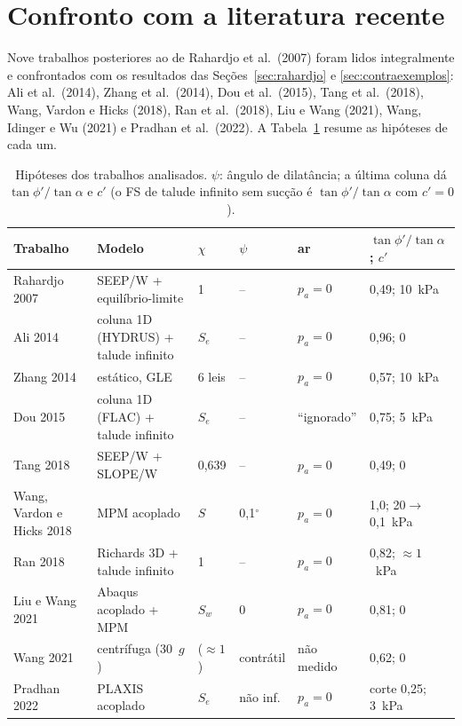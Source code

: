 \section{Confronto com a literatura recente}\label{sec:literatura}

Nove trabalhos posteriores ao de Rahardjo et al.\ (2007) foram lidos integralmente e confrontados com os resultados
das Se\c{c}\~oes~\ref{sec:rahardjo} e \ref{sec:contraexemplos}: Ali et al.\ (2014), Zhang et al.\ (2014),
Dou et al.\ (2015), Tang et al.\ (2018), Wang, Vardon e Hicks (2018), Ran et al.\ (2018), Liu e Wang (2021),
Wang, Idinger e Wu (2021) e Pradhan et al.\ (2022). A Tabela~\ref{tab:literatura} resume as hip\'oteses de cada um.

\begin{table}[h!]
\centering\small
\caption{Hip\'oteses dos trabalhos analisados. $\psi$: \^angulo de dilat\^ancia; a \'ultima coluna d\'a
$\tan\phi'/\tan\alpha$ e $c'$ (o FS de talude infinito sem suc\c{c}\~ao \'e $\tan\phi'/\tan\alpha$ com $c'=0$).}
\label{tab:literatura}
\begin{tabular}{p{2.5cm}p{3.6cm}p{1.2cm}p{1.5cm}p{1.6cm}p{2.4cm}}
\toprule
Trabalho & Modelo & $\chi$ & $\psi$ & ar & $\tan\phi'/\tan\alpha$; $c'$\\
\midrule
Rahardjo 2007 & SEEP/W + equil\'ibrio-limite & 1 & -- & $p_a=0$ & 0,49; 10~kPa\\
Ali 2014 & coluna 1D (HYDRUS) + talude infinito & $S_e$ & -- & $p_a=0$ & 0,96; 0\\
Zhang 2014 & est\'atico, GLE & 6 leis & -- & $p_a=0$ & 0,57; 10~kPa\\
Dou 2015 & coluna 1D (FLAC) + talude infinito & $S_e$ & -- & ``ignorado'' & 0,75; 5~kPa\\
Tang 2018 & SEEP/W + SLOPE/W & 0,639 & -- & $p_a=0$ & 0,49; 0\\
Wang, Vardon e Hicks 2018 & MPM acoplado & $S$ & 0,1$^\circ$ & $p_a=0$ & 1,0; 20$\to$0,1~kPa\\
Ran 2018 & Richards 3D + talude infinito & 1 & -- & $p_a=0$ & 0,82; $\approx1$~kPa\\
Liu e Wang 2021 & Abaqus acoplado + MPM & $S_w$ & 0 & $p_a=0$ & 0,81; 0\\
Wang 2021 & centr\'ifuga (30~$g$) & ($\approx1$) & contr\'atil & n\~ao medido & 0,62; 0\\
Pradhan 2022 & PLAXIS acoplado & $S_e$ & n\~ao inf. & $p_a=0$ & corte 0,25; 3~kPa\\
\bottomrule
\end{tabular}
\end{table}

